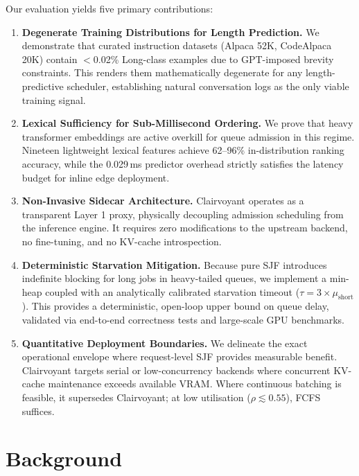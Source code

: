 \documentclass[10pt]{article}
\begin{document}
Our evaluation yields five primary contributions:

\begin{enumerate}
\item \textbf{Degenerate Training Distributions for Length Prediction.} We demonstrate that curated instruction datasets (Alpaca 52K, CodeAlpaca 20K) contain $<$0.02\% Long-class examples due to GPT-imposed brevity constraints. This renders them mathematically degenerate for any length-predictive scheduler, establishing natural conversation logs as the only viable training signal.

\item \textbf{Lexical Sufficiency for Sub-Millisecond Ordering.} We prove that heavy transformer embeddings are active overkill for queue admission in this regime. Nineteen lightweight lexical features achieve 62–96\% in-distribution ranking accuracy, while the 0.029\,ms predictor overhead strictly satisfies the latency budget for inline edge deployment.

\item \textbf{Non-Invasive Sidecar Architecture.} Clairvoyant operates as a transparent Layer 1 proxy, physically decoupling admission scheduling from the inference engine. It requires zero modifications to the upstream backend, no fine-tuning, and no KV-cache introspection.

\item \textbf{Deterministic Starvation Mitigation.} Because pure SJF introduces indefinite blocking for long jobs in heavy-tailed queues, we implement a min-heap coupled with an analytically calibrated starvation timeout ($\tau=3\times\mu_{\text{short}}$). This provides a deterministic, open-loop upper bound on queue delay, validated via end-to-end correctness tests and large-scale GPU benchmarks.

\item \textbf{Quantitative Deployment Boundaries.} We delineate the exact operational envelope where request-level SJF provides measurable benefit. Clairvoyant targets serial or low-concurrency backends where concurrent KV-cache maintenance exceeds available VRAM. Where continuous batching is feasible, it supersedes Clairvoyant; at low utilisation ($\rho \lesssim 0.55$), FCFS suffices.
\end{enumerate}

\section{Background}
\label{sec:background}
\end{document}
